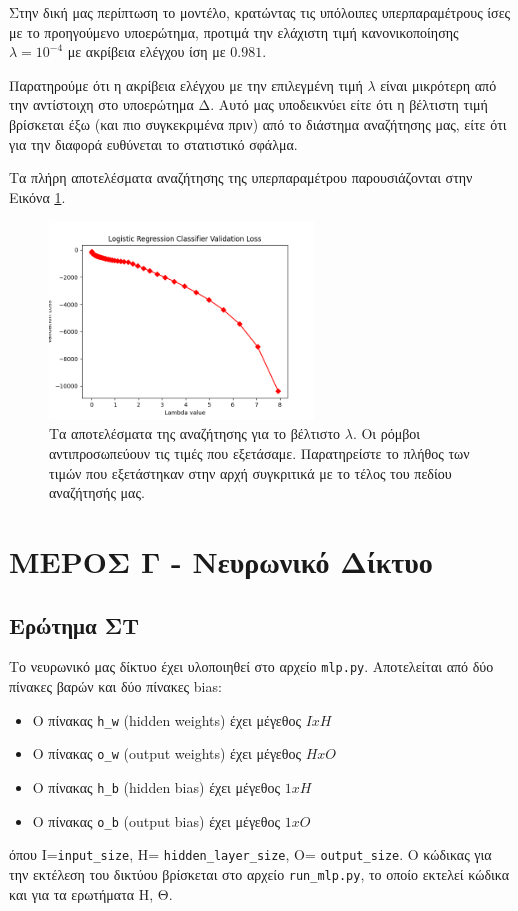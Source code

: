 \documentclass{article}
\newcommand{\code}{\texttt}
\begin{document}
Στην δική μας περίπτωση το μοντέλο, κρατώντας τις υπόλοιπες υπερπαραμέτρους ίσες με το προηγούμενο υποερώτημα, προτιμά την ελάχιστη τιμή κανονικοποίησης \code{$\lambda = 10^{-4}$} με  ακρίβεια ελέγχου ίση με $0.981$. 

Παρατηρούμε ότι η ακρίβεια ελέγχου με την επιλεγμένη τιμή \code{$\lambda$} είναι μικρότερη από την αντίστοιχη στο υποερώτημα Δ. Αυτό μας υποδεικνύει είτε ότι η βέλτιστη τιμή βρίσκεται έξω (και πιο συγκεκριμένα πριν) από το διάστημα αναζήτησης μας, είτε ότι για την διαφορά ευθύνεται το στατιστικό σφάλμα.

Τα πλήρη αποτελέσματα αναζήτησης της υπερπαραμέτρου παρουσιάζονται στην Εικόνα \ref{logistic_lambda_accuracy}.

\begin{figure}
	\includegraphics[width=7cm]{logistic_lambda_accuracy.png}
	\centering
	\caption{ Τα αποτελέσματα της αναζήτησης για το βέλτιστο \code{$\lambda$}. Οι ρόμβοι αντιπροσωπεύουν τις τιμές που εξετάσαμε. Παρατηρείστε το πλήθος των τιμών που εξετάστηκαν στην αρχή συγκριτικά με το τέλος του πεδίου αναζήτησής μας.}
	\label{logistic_lambda_accuracy}
\end{figure}


\section{ΜΕΡΟΣ Γ - Νευρωνικό Δίκτυο}

\subsection{Ερώτημα ΣΤ}

Το νευρωνικό μας δίκτυο έχει υλοποιηθεί στο αρχείο \code{mlp.py}. Αποτελείται από δύο πίνακες βαρών και δύο πίνακες bias:
\begin{itemize}
	\item  Ο πίνακας \code{h\_w} (hidden weights) έχει μέγεθος $IxH$
	\item  Ο πίνακας \code{o\_w} (output weights) έχει μέγεθος $HxO$
	\item  Ο πίνακας \code{h\_b} (hidden bias) έχει μέγεθος $1xH$
	\item  Ο πίνακας \code{o\_b} (output bias) έχει μέγεθος $1xO$
\end{itemize}
όπου I=\code{input\_size}, H= \code{hidden\_layer\_size}, O= \code{output\_size}. Ο κώδικας για την εκτέλεση του δικτύου βρίσκεται στο αρχείο \code{run\_mlp.py}, το οποίο εκτελεί κώδικα και για τα ερωτήματα Η, Θ.
\end{document}
